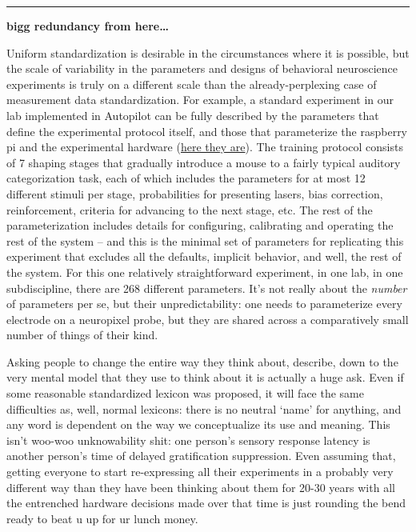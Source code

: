 \documentclass[nohyper]{tufte-book-jls}
\begin{document}
\begin{center}\rule{0.5\linewidth}{0.5pt}\end{center}

\textbf{bigg redundancy from here\ldots{}}

Uniform standardization is desirable in the circumstances where it is
possible, but the scale of variability in the parameters and designs of
behavioral neuroscience experiments is truly on a different scale than
the already-perplexing case of measurement data standardization. For
example, a standard experiment in our lab implemented in Autopilot can
be fully described by the parameters that define the experimental
protocol itself, and those that parameterize the raspberry pi and the
experimental hardware
(\href{https://gist.github.com/sneakers-the-rat/eebe675326a157df49f66f62c4e33a6e}{here
they are}). The training protocol consists of 7 shaping stages that
gradually introduce a mouse to a fairly typical auditory categorization
task, each of which includes the parameters for at most 12 different
stimuli per stage, probabilities for presenting lasers, bias correction,
reinforcement, criteria for advancing to the next stage, etc. The rest
of the parameterization includes details for configuring, calibrating
and operating the rest of the system -- and this is the minimal set of
parameters for replicating this experiment that excludes all the
defaults, implicit behavior, and well, the rest of the system. For this
one relatively straightforward experiment, in one lab, in one
subdiscipline, there are 268 different parameters. It's not really about
the \emph{number} of parameters per se, but their unpredictability: one
needs to parameterize every electrode on a neuropixel probe, but they
are shared across a comparatively small number of things of their kind.

Asking people to change the entire way they think about, describe, down
to the very mental model that they use to think about it is actually a
huge ask. Even if some reasonable standardized lexicon was proposed, it
will face the same difficulties as, well, normal lexicons: there is no
neutral `name' for anything, and any word is dependent on the way we
conceptualize its use and meaning. This isn't woo-woo unknowability
shit: one person's sensory response latency is another person's time of
delayed gratification suppression. Even assuming that, getting everyone
to start re-expressing all their experiments in a probably very
different way than they have been thinking about them for 20-30 years
with all the entrenched hardware decisions made over that time is just
rounding the bend ready to beat u up for ur lunch money.
\end{document}
